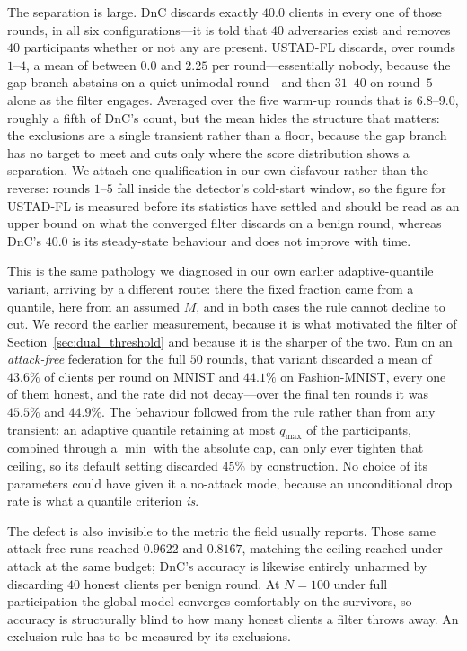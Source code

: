 \documentclass[journal]{IEEEtran}
\begin{document}
The separation is large. DnC discards exactly $40.0$ clients in every one of those rounds, in all six configurations---it is told that $40$ adversaries exist and removes $40$ participants whether or not any are present. USTAD-FL discards, over rounds $1$--$4$, a mean of between $0.0$ and $2.25$ per round---essentially nobody, because the gap branch abstains on a quiet unimodal round---and then $31$--$40$ on round~$5$ alone as the filter engages. Averaged over the five warm-up rounds that is $6.8$--$9.0$, roughly a fifth of DnC's count, but the mean hides the structure that matters: the exclusions are a single transient rather than a floor, because the gap branch has no target to meet and cuts only where the score distribution shows a separation. We attach one qualification in our own disfavour rather than the reverse: rounds $1$--$5$ fall inside the detector's cold-start window, so the figure for USTAD-FL is measured before its statistics have settled and should be read as an upper bound on what the converged filter discards on a benign round, whereas DnC's $40.0$ is its steady-state behaviour and does not improve with time.

This is the same pathology we diagnosed in our own earlier adaptive-quantile variant, arriving by a different route: there the fixed fraction came from a quantile, here from an assumed $M$, and in both cases the rule cannot decline to cut. We record the earlier measurement, because it is what motivated the filter of Section~\ref{sec:dual_threshold} and because it is the sharper of the two. Run on an \emph{attack-free} federation for the full $50$ rounds, that variant discarded a mean of $43.6\%$ of clients per round on MNIST and $44.1\%$ on Fashion-MNIST, every one of them honest, and the rate did not decay---over the final ten rounds it was $45.5\%$ and $44.9\%$. The behaviour followed from the rule rather than from any transient: an adaptive quantile retaining at most $q_{\max}$ of the participants, combined through a $\min$ with the absolute cap, can only ever tighten that ceiling, so its default setting discarded $45\%$ by construction. No choice of its parameters could have given it a no-attack mode, because an unconditional drop rate is what a quantile criterion \emph{is}.

The defect is also invisible to the metric the field usually reports. Those same attack-free runs reached $0.9622$ and $0.8167$, matching the ceiling reached under attack at the same budget; DnC's accuracy is likewise entirely unharmed by discarding $40$ honest clients per benign round. At $N = 100$ under full participation the global model converges comfortably on the survivors, so accuracy is structurally blind to how many honest clients a filter throws away. An exclusion rule has to be measured by its exclusions.
\end{document}
